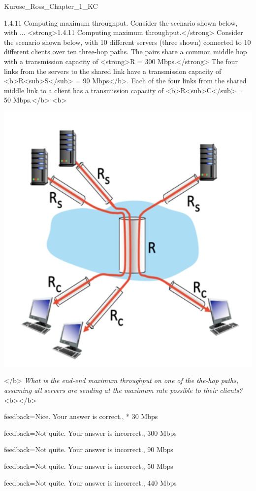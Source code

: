\documentclass[a4paper]{article}
\begin{document}
\begin{quiz}{Kurose_Ross_Chapter_1_KC}
\begin{multi}[
	points=1,
	penalty=0.33333,
]{1.4.11 Computing maximum throughput. Consider the scenario shown below, with ...}
<strong>1.4.11 Computing maximum throughput.</strong> Consider the scenario shown below, with 10 different servers (three shown) connected to 10 different clients over ten three-hop paths. The pairs share a common middle hop with a transmission capacity of <strong>R = 300 Mbps.</strong> The four links from the servers to the shared link have a transmission capacity of <b>R<sub>S</sub> = 90 Mbps</b>. Each of the four links from the shared middle link to a client has a transmission capacity of <b>R<sub>C</sub> = 50 Mbps.</b> <b>
\begin{center}
\includegraphics[width=\linewidth]{figs/1.4.11.png}
\end{center}
</b> \emph{What is the end-end maximum throughput on one of the the-hop paths, assuming all servers are sending at the maximum rate possible to their clients?}<b></b>  
\item[feedback={Nice. Your answer is correct.},]* 30 Mbps
\item[feedback={Not quite. Your answer is incorrect.},] 300 Mbps
\item[feedback={Not quite. Your answer is incorrect.},] 90 Mbps
\item[feedback={Not quite. Your answer is incorrect.},] 50 Mbps
\item[feedback={Not quite. Your answer is incorrect.},] 440 Mbps
\end{multi}


\end{quiz}
\end{document}
